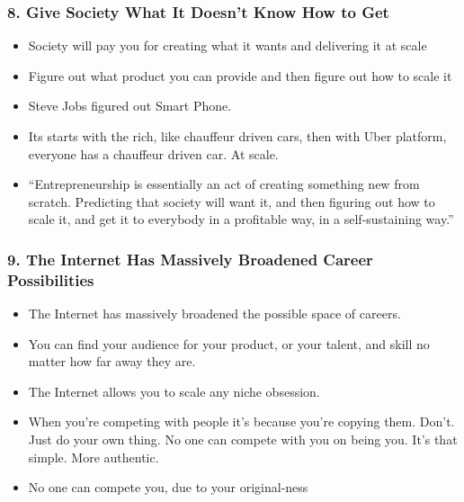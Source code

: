 \begin{frame}[fragile]
\frametitle{8. Give Society What It Doesn't Know How to Get}
\begin{itemize}
\item Society will pay you for creating what it wants and delivering it at scale
\item Figure out what product you can provide and then figure out how to scale it
\item Steve Jobs figured out Smart Phone.
\item Its starts with the rich, like chauffeur driven cars, then with Uber platform, everyone has a chauffeur driven car. At scale.
\item ``Entrepreneurship is essentially an act of creating something new from scratch. Predicting that society will want it, and then figuring out how to scale it, and get it to everybody in a profitable way, in a self-sustaining way.''
\end{itemize}
\end{frame}

\begin{frame}[fragile]
\frametitle{9. The Internet Has Massively Broadened Career Possibilities}
\begin{itemize}
\item The Internet has massively broadened the possible space of careers.
\item You can find your audience for your product, or your talent, and skill no matter how far away they are.
\item The Internet allows you to scale any niche obsession.
\item When you're competing with people it's because you're copying them. Don't.  Just do your own thing. No one can compete with you on being you. It's that simple. More authentic. 
\item No one can compete you, due to your original-ness
\end{itemize}
\end{frame}


